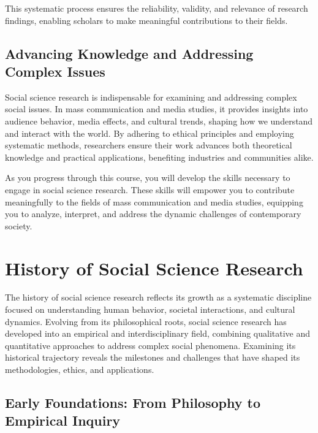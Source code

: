 \documentclass[
]{book}
\begin{document}
This systematic process ensures the reliability, validity, and relevance of research findings, enabling scholars to make meaningful contributions to their fields.

\subsection*{Advancing Knowledge and Addressing Complex Issues}\label{advancing-knowledge-and-addressing-complex-issues}

Social science research is indispensable for examining and addressing complex social issues. In mass communication and media studies, it provides insights into audience behavior, media effects, and cultural trends, shaping how we understand and interact with the world. By adhering to ethical principles and employing systematic methods, researchers ensure their work advances both theoretical knowledge and practical applications, benefiting industries and communities alike.

As you progress through this course, you will develop the skills necessary to engage in social science research. These skills will empower you to contribute meaningfully to the fields of mass communication and media studies, equipping you to analyze, interpret, and address the dynamic challenges of contemporary society.

\section{History of Social Science Research}\label{history-of-social-science-research}

The history of social science research reflects its growth as a systematic discipline focused on understanding human behavior, societal interactions, and cultural dynamics. Evolving from its philosophical roots, social science research has developed into an empirical and interdisciplinary field, combining qualitative and quantitative approaches to address complex social phenomena. Examining its historical trajectory reveals the milestones and challenges that have shaped its methodologies, ethics, and applications.

\subsection*{Early Foundations: From Philosophy to Empirical Inquiry}\label{early-foundations-from-philosophy-to-empirical-inquiry}
\end{document}
